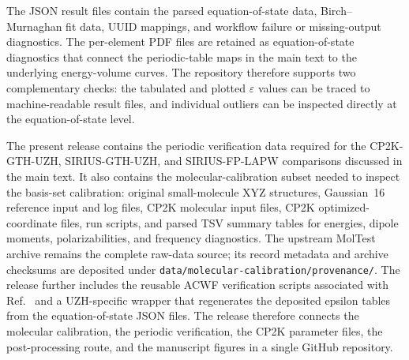 \documentclass[aps,prb,preprint,amsmath,amssymb,superscriptaddress,longbibliography,floatfix]{revtex4-2}
\begin{document}
The JSON result files contain the parsed equation-of-state data, Birch--Murnaghan fit data, UUID mappings, and workflow failure or missing-output diagnostics. The per-element PDF files are retained as equation-of-state diagnostics that connect the periodic-table maps in the main text to the underlying energy-volume curves. The repository therefore supports two complementary checks: the tabulated and plotted $\varepsilon$ values can be traced to machine-readable result files, and individual outliers can be inspected directly at the equation-of-state level.

The present release contains the periodic verification data required for the CP2K-GTH-UZH, SIRIUS-GTH-UZH, and SIRIUS-FP-LAPW comparisons discussed in the main text. It also contains the molecular-calibration subset needed to inspect the basis-set calibration: original small-molecule XYZ structures, Gaussian~16 reference input and log files, CP2K molecular input files, CP2K optimized-coordinate files, run scripts, and parsed TSV summary tables for energies, dipole moments, polarizabilities, and frequency diagnostics. The upstream MolTest archive remains the complete raw-data source; its record metadata and archive checksums are deposited under \texttt{data/molecular-calibration/provenance/}. The release further includes the reusable ACWF verification scripts associated with Ref.~\cite{Bosoni2024} and a UZH-specific wrapper that regenerates the deposited epsilon tables from the equation-of-state JSON files. The release therefore connects the molecular calibration, the periodic verification, the CP2K parameter files, the post-processing route, and the manuscript figures in a single GitHub repository.


\end{document}
